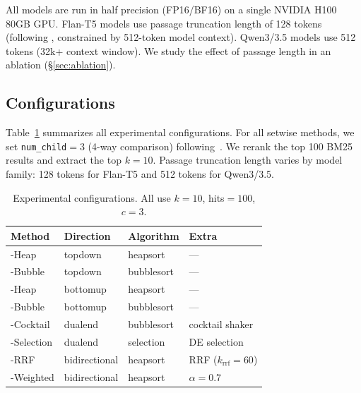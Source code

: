 All models are run in half precision (FP16/BF16) on a single NVIDIA H100 80GB GPU. Flan-T5 models use passage truncation length of 128 tokens (following \citet{zhuang2024setwise}, constrained by 512-token model context). Qwen3/3.5 models use 512 tokens (32k+ context window). We study the effect of passage length in an ablation (\S\ref{sec:ablation}).

\subsection{Configurations}

Table~\ref{tab:configs} summarizes all experimental configurations. For all setwise methods, we set \texttt{num\_child}$=3$ (4-way comparison) following~\citet{zhuang2024setwise}. We rerank the top 100 BM25 results and extract the top $k=10$. Passage truncation length varies by model family: 128 tokens for Flan-T5 and 512 tokens for Qwen3/3.5.

\begin{table}[!htbp]
\caption{Experimental configurations. All use $k{=}10$, hits${}={100}$, $c{=}3$.}
\label{tab:configs}
\small
\begin{tabular}{llll}
\toprule
\textbf{Method} & \textbf{Direction} & \textbf{Algorithm} & \textbf{Extra} \\
\midrule
\topdown{}-Heap & topdown & heapsort & --- \\
\topdown{}-Bubble & topdown & bubblesort & --- \\
\bottomup{}-Heap & bottomup & heapsort & --- \\
\bottomup{}-Bubble & bottomup & bubblesort & --- \\
\dualend{}-Cocktail & dualend & bubblesort & cocktail shaker \\
\dualend{}-Selection & dualend & selection & DE selection \\
\bidir{}-RRF & bidirectional & heapsort & RRF ($k_{\text{rrf}}{=}60$) \\
\bidir{}-Weighted & bidirectional & heapsort & $\alpha{=}0.7$ \\
\bottomrule
\end{tabular}
\end{table}

